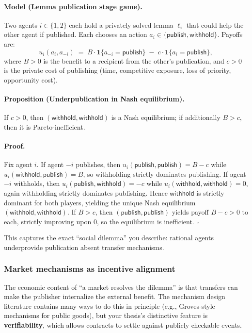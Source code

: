 \paragraph{Model (Lemma publication stage game).}
Two agents \(i\in\{1,2\}\) each hold a privately solved lemma \(\ell_i\) that could help the other agent if published. Each chooses an action \(a_i\in\{\mathsf{publish},\mathsf{withhold}\}\). Payoffs are:
\[
u_i(a_i,a_{-i}) \;=\; B\cdot \mathbf{1}\{a_{-i}=\mathsf{publish}\} \;-\; c\cdot \mathbf{1}\{a_i=\mathsf{publish}\},
\]
where \(B>0\) is the benefit to a recipient from the other's publication, and \(c>0\) is the private cost of publishing (time, competitive exposure, loss of priority, opportunity cost).

\paragraph{Proposition (Underpublication in Nash equilibrium).}
If \(c>0\), then \((\mathsf{withhold},\mathsf{withhold})\) is a Nash equilibrium; if additionally \(B>c\), then it is Pareto-inefficient.

\paragraph{Proof.}
Fix agent \(i\). If agent \(-i\) publishes, then \(u_i(\mathsf{publish},\mathsf{publish}) = B-c\) while \(u_i(\mathsf{withhold},\mathsf{publish})=B\), so withholding strictly dominates publishing. If agent \(-i\) withholds, then \(u_i(\mathsf{publish},\mathsf{withhold})=-c\) while \(u_i(\mathsf{withhold},\mathsf{withhold})=0\), again withholding strictly dominates publishing. Hence \(\mathsf{withhold}\) is strictly dominant for both players, yielding the unique Nash equilibrium \((\mathsf{withhold},\mathsf{withhold})\). If \(B>c\), then \((\mathsf{publish},\mathsf{publish})\) yields payoff \(B-c>0\) to each, strictly improving upon 0, so the equilibrium is inefficient. \(\square\)

This captures the exact ``social dilemma'' you describe: rational agents underprovide publication absent transfer mechanisms.

\subsubsection{Market mechanisms as incentive alignment}

The economic content of ``a market resolves the dilemma'' is that transfers can make the publisher internalize the external benefit. The mechanism design literature contains many ways to do this in principle (e.g., Groves-style mechanisms for public goods), but your thesis's distinctive feature is \textbf{verifiability}, which allows contracts to settle against publicly checkable events.

